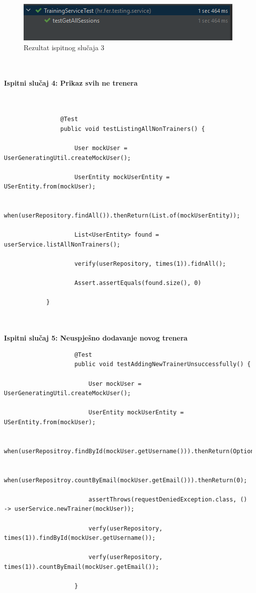 			
				\begin{figure}[H]
				\includegraphics[scale=1]{dijagrami/4.png} %
				\centering
				\caption{Rezultat ispitnog slučaja 3}
				\label{fig:ispitnislucaj3rez}
			\end{figure}\\\\
		
		
			\textbf{Ispitni slučaj 4: Prikaz svih ne trenera}\\\\
		
			\begin{verbatim}
				
				@Test
				public void testListingAllNonTrainers() {
					
					User mockUser = UserGeneratingUtil.createMockUser();
					
					UserEntity mockUserEntity = USerEntity.from(mockUser);
					
					when(userRepository.findAll()).thenReturn(List.of(mockUserEntity));
					
					List<UserEntity> found = userService.listAllNonTrainers();
					
					verify(userRepository, times(1)).fidnAll();
					
					Assert.assertEquals(found.size(), 0)
					
			}
			\end{verbatim}\\\\
		
			\textbf{Ispitni slučaj 5: Neuspješno dodavanje novog trenera}\\
			
			\begin{verbatim}
					@Test
					public void testAddingNewTrainerUnsuccessfully() {
						
						User mockUser = UserGeneratingUtil.createMockUser();
						
						UserEntity mockUserEntity = USerEntity.from(mockUser);
						
						when(userRepositroy.findById(mockUser.getUsername())).thenReturn(Optional.of(mockUserEntity));
						
						when(userRepositroy.countByEmail(mockUser.getEmail())).thenReturn(0);
						
						assertThrows(requestDeniedException.class, () -> userService.newTrainer(mockUser));
						
						verfy(userRepository, times(1)).findById(mockUser.getUsername());
						
						verfy(userRepository, times(1)).countByEmail(mockUser.getEmail());
						
					}
			\end{verbatim}\\\\
		
